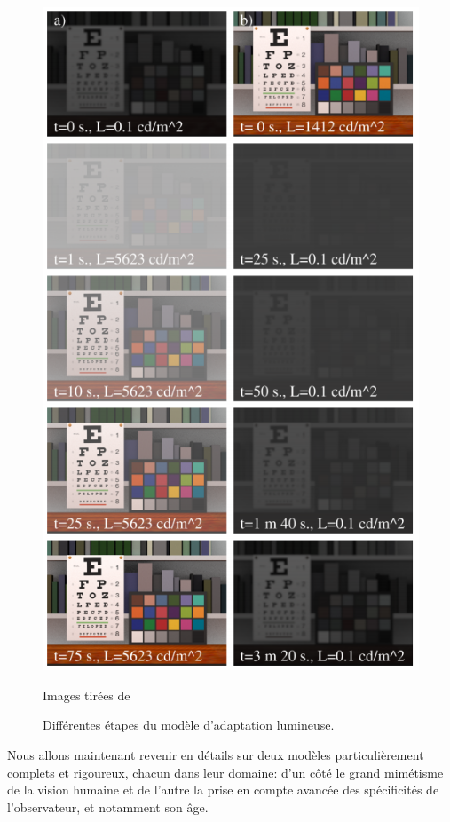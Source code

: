	\begin{figure}
		\centering
		\includegraphics[scale=1]{Figures/FerwerdaAdaptationSteps}
		\caption{Différentes étapes du modèle d'adaptation lumineuse.}{Images tirées de \citep{ferwerda_model_1996}}
		\label{fig:ferwerda_adaptation_steps}
	\end{figure}
	
	\par Nous allons maintenant revenir en détails sur deux modèles particulièrement complets et rigoureux, chacun dans leur domaine: d'un côté le grand mimétisme de la vision humaine et de l'autre la prise en compte avancée des spécificités de l'observateur, et notamment son âge.
	
